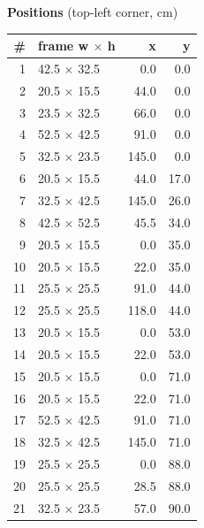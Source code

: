 \documentclass[a4paper,landscape,10pt]{article}
\begin{document}
\begin{minipage}[t]{0.25\textwidth}
\vspace{8pt}
{\bfseries Positions} (top-left corner, cm)\\[2pt]
\tiny
\begin{tabular}{@{}r l r r@{}}
\toprule
\# & frame w $\times$ h & x & y \\
\midrule
1 & 42.5 $\times$ 32.5 & 0.0 & 0.0 \\
2 & 20.5 $\times$ 15.5 & 44.0 & 0.0 \\
3 & 23.5 $\times$ 32.5 & 66.0 & 0.0 \\
4 & 52.5 $\times$ 42.5 & 91.0 & 0.0 \\
5 & 32.5 $\times$ 23.5 & 145.0 & 0.0 \\
6 & 20.5 $\times$ 15.5 & 44.0 & 17.0 \\
7 & 32.5 $\times$ 42.5 & 145.0 & 26.0 \\
8 & 42.5 $\times$ 52.5 & 45.5 & 34.0 \\
9 & 20.5 $\times$ 15.5 & 0.0 & 35.0 \\
10 & 20.5 $\times$ 15.5 & 22.0 & 35.0 \\
11 & 25.5 $\times$ 25.5 & 91.0 & 44.0 \\
12 & 25.5 $\times$ 25.5 & 118.0 & 44.0 \\
13 & 20.5 $\times$ 15.5 & 0.0 & 53.0 \\
14 & 20.5 $\times$ 15.5 & 22.0 & 53.0 \\
15 & 20.5 $\times$ 15.5 & 0.0 & 71.0 \\
16 & 20.5 $\times$ 15.5 & 22.0 & 71.0 \\
17 & 52.5 $\times$ 42.5 & 91.0 & 71.0 \\
18 & 32.5 $\times$ 42.5 & 145.0 & 71.0 \\
19 & 25.5 $\times$ 25.5 & 0.0 & 88.0 \\
20 & 25.5 $\times$ 25.5 & 28.5 & 88.0 \\
21 & 32.5 $\times$ 23.5 & 57.0 & 90.0 \\
\bottomrule
\end{tabular}
\end{minipage}
\clearpage
\end{document}

